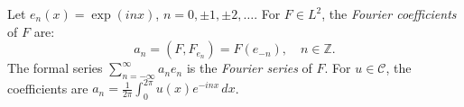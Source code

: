 Let $e_n(x) = \exp(inx)$, $n = 0, \pm 1, \pm 2, \ldots$. For $F \in L^2$, the \textit{Fourier coefficients} of $F$ are:
\[
a_n = (F, F_{e_n}) = F(e_{-n}), \quad n \in \mathbb{Z}.
\]
The formal series $\sum_{n=-\infty}^{\infty} a_n e_n$ is the \textit{Fourier series} of $F$. For $u \in \mathcal{C}$, the coefficients are $a_n = \frac{1}{2\pi} \int_0^{2\pi} u(x) e^{-inx}\,dx$.
